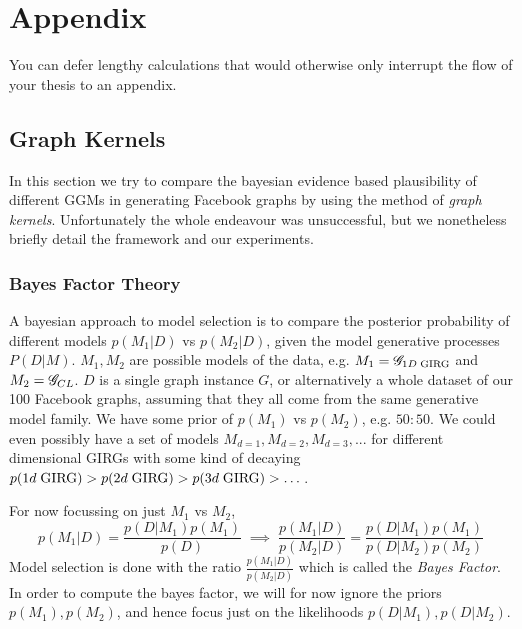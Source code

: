 \chapter{Appendix}
\minitoc
You can defer lengthy calculations that would otherwise only interrupt
the flow of your thesis to an appendix.


\section{Graph Kernels}
\label{chap:graph_kernels}

In this section we try to compare the bayesian evidence based plausibility of different GGMs in generating Facebook graphs by using the method of \textit{graph kernels}. Unfortunately the whole endeavour was unsuccessful, but we nonetheless briefly detail the framework and our experiments.

\subsection{Bayes Factor Theory}
A bayesian approach to model selection is to compare the posterior probability of different models $p(M_1 | D)$ vs $p(M_2 | D)$, given the model generative processes $P(D | M)$. 
$M_1, M_2$ are possible models of the data, e.g. $M_1 = \mathscr{G}_{1D\; \mathrm{GIRG}}$ and $M_2 = \mathscr{G}_{CL}$.
$D$ is a single graph instance $G$, or alternatively a whole dataset of our 100 Facebook graphs, assuming that they all come from the same generative model family.
We have some prior of $p(M_1)$ vs $p(M_2)$, e.g. $50 : 50$. We could even possibly have a set of models $M_{d=1}, M_{d=2}, M_{d=3}, ...$ for different dimensional GIRGs with some kind of decaying $p(1d\; \mathrm{GIRG}) > p(2d\; \mathrm{GIRG}) > p(3d\; \mathrm{GIRG}) > \dots$.

For now focussing on just $M_1$ vs $M_2$,
\begin{equation}
  p(M_1 | D) = \frac{p(D | M_1) p(M_1)}{p(D)} 
  \;
  \implies
  \;
  \frac{p(M_1 | D)}{p(M_2 | D)} = \frac{p(D | M_1) p(M_1)}{p(D | M_2) p(M_2)}
\end{equation}
Model selection is done with the ratio $\frac{p(M_1 | D)}{p(M_2 | D)}$ which is called the \textit{Bayes Factor}.
In order to compute the bayes factor, we will for now ignore the priors $p(M_1), p(M_2)$, and hence focus just on the likelihoods $p(D | M_1), p(D | M_2)$.



